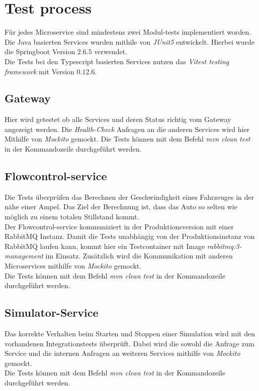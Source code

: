 \section{Test process}
Für jedes Microservice sind mindestens zwei Modul-tests implementiert worden.\\
Die Java basierten Services wurden mithile von \textit{JUnit5} entwickelt. Hierbei wurde die Springboot Version $2.6.5$ verwendet. \\
Die Tests bei den Typescript basierten Services nutzen das \textit{Vitest testing framework}  mit Version $0.12.6$.\\

\subsection{Gateway}
Hier wird getestet ob alle Services und deren Status richtig vom Gateway angezeigt werden. Die \textit{Health-Check} Anfragen an die anderen Services wird hier Mithilfe von \textit{Mockito} gemockt. 
Die Tests können mit dem Befehl \textit{mvn clean test} in der Kommandozeile durchgeführt werden. 
\subsection{Flowcontrol-service}
Die Tests überprüfen das Berechnen der Geschwindigkeit eines Fahrzeuges in der nähe einer Ampel. Das Ziel der Berechnung ist, dass das Auto so selten wie möglich zu einem totalen Stillstand kommt.\\ 
Der Flowcontrol-service kommuniziert in der Produktionsversion mit einer RabbitMQ Instanz. Damit die Tests unabhängig von der Produktionsinstanz von RabbitMQ laufen kann, kommt hier ein Testcontainer mit Image \textit{rabbitmq:3-management} im Einsatz. Zusätzlich wird die Kommunikation mit anderen Microservices mithilfe von \textit{Mockito} gemockt.\\
Die Tests können mit dem Befehl \textit{mvn clean test} in der Kommandozeile durchgeführt werden. 
\subsection{Simulator-Service}
Das korrekte Verhalten beim Starten und Stoppen einer Simulation wird mit den vorhandenen Integrationstests überprüft. Dabei wird die sowohl die Anfrage zum Service und die internen Anfragen an weiteren Services mithilfe von \textit{Mockito} gemockt.\\
Die Tests können mit dem Befehl \textit{mvn clean test} in der Kommandozeile durchgeführt werden. 

